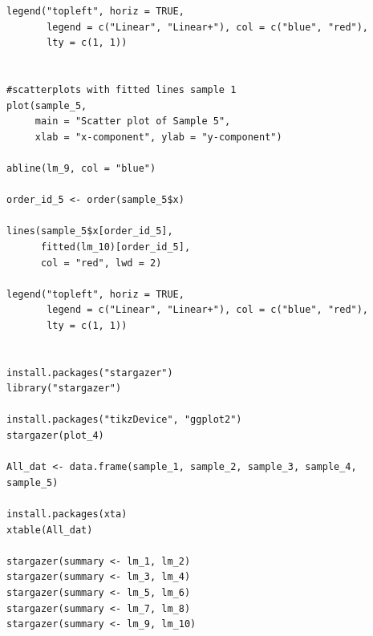 \documentclass{article}
\begin{document}
\begin{verbatim}
legend("topleft", horiz = TRUE,
       legend = c("Linear", "Linear+"), col = c("blue", "red"),
       lty = c(1, 1))


#scatterplots with fitted lines sample 1
plot(sample_5,
     main = "Scatter plot of Sample 5",
     xlab = "x-component", ylab = "y-component")

abline(lm_9, col = "blue")

order_id_5 <- order(sample_5$x)

lines(sample_5$x[order_id_5],
      fitted(lm_10)[order_id_5],
      col = "red", lwd = 2)

legend("topleft", horiz = TRUE,
       legend = c("Linear", "Linear+"), col = c("blue", "red"),
       lty = c(1, 1))


install.packages("stargazer")
library("stargazer")

install.packages("tikzDevice", "ggplot2")
stargazer(plot_4)

All_dat <- data.frame(sample_1, sample_2, sample_3, sample_4, sample_5)

install.packages(xta)
xtable(All_dat)

stargazer(summary <- lm_1, lm_2)
stargazer(summary <- lm_3, lm_4)
stargazer(summary <- lm_5, lm_6)
stargazer(summary <- lm_7, lm_8)
stargazer(summary <- lm_9, lm_10)

\end{verbatim}
\end{document}
